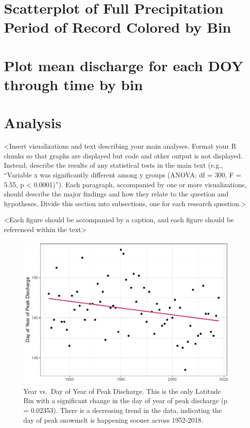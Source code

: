 \documentclass[12pt,]{article}
\begin{document}
\hypertarget{scatterplot-of-full-precipitation-period-of-record-colored-by-bin}{%
\section{Scatterplot of Full Precipitation Period of Record Colored by
Bin}\label{scatterplot-of-full-precipitation-period-of-record-colored-by-bin}}

\hypertarget{plot-mean-discharge-for-each-doy-through-time-by-bin}{%
\section{Plot mean discharge for each DOY through time by
bin}\label{plot-mean-discharge-for-each-doy-through-time-by-bin}}

\newpage

\hypertarget{analysis}{%
\section{Analysis}\label{analysis}}

\textless{}Insert visualizations and text describing your main analyses.
Format your R chunks so that graphs are displayed but code and other
output is not displayed. Instead, describe the results of any
statistical tests in the main text (e.g., ``Variable x was significantly
different among y groups (ANOVA; df = 300, F = 5.55, p \textless{}
0.0001)''). Each paragraph, accompanied by one or more visualizations,
should describe the major findings and how they relate to the question
and hypotheses. Divide this section into subsections, one for each
research question.\textgreater{}

\textless{}Each figure should be accompanied by a caption, and each
figure should be referenced within the text\textgreater{}

\begin{figure}
\centering
\includegraphics{Project_Report_v2_files/figure-latex/unnamed-chunk-3-1.pdf}
\caption{Year vs.~Day of Year of Peak Discharge. This is the only
Latitude Bin with a significant change in the day of year of peak
discharge (p = 0.02353). There is a decreasing trend in the data,
indicating the day of peak snowmelt is happening sooner across
1952-2018.}
\end{figure}
\end{document}
